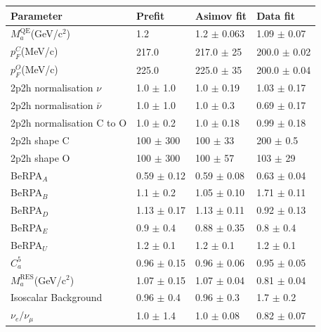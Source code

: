 \begin{table}[ht]
  \center
  \begin{tabular}{llll}
    \toprule
    Parameter & Prefit & \Gls{Asimov} fit & Data fit  \\
    \midrule
    $M_a^{\text{QE}}$(GeV/c$^2$)           & 1.2              & 1.2 $\pm$ 0.063 & 1.09 $\pm$ 0.07     \\ 
    $p_F^C$(MeV/c)                       & 217.0            & 217.0 $\pm$ 25  & 200.0 $\pm$ 0.02    \\ 
    $p_F^O$(MeV/c)                       & 225.0            & 225.0 $\pm$ 35  & 200.0 $\pm$ 0.04    \\ 
    \gls{2p2h} normalisation $\nu$       & 1.0 $\pm$ 1.0    & 1.0 $\pm$ 0.19  & 1.03 $\pm$ 0.17     \\ 
    \gls{2p2h} normalisation $\bar{\nu}$ & 1.0 $\pm$ 1.0    & 1.0 $\pm$ 0.3   & 0.69 $\pm$ 0.17     \\ 
    \gls{2p2h} normalisation C to O      & 1.0 $\pm$ 0.2    & 1.0 $\pm$ 0.18  & 0.99 $\pm$ 0.18     \\ 
    \gls{2p2h} shape C                   & 100 $\pm$ 300    & 100 $\pm$ 33  & 200 $\pm$ 0.5         \\ 
    \gls{2p2h} shape O                   & 100 $\pm$ 300    & 100 $\pm$ 57  & 103 $\pm$ 29          \\ 
    BeRPA$_A$                            & 0.59 $\pm$ 0.12  & 0.59 $\pm$ 0.08 & 0.63 $\pm$ 0.04     \\ 
    BeRPA$_B$                            & 1.1 $\pm$ 0.2    & 1.05 $\pm$ 0.10 & 1.71 $\pm$ 0.11     \\ 
    BeRPA$_D$                            & 1.13 $\pm$ 0.17  & 1.13 $\pm$ 0.11 & 0.92 $\pm$ 0.13     \\ 
    BeRPA$_E$                            & 0.9 $\pm$ 0.4    & 0.88 $\pm$ 0.35 & 0.8 $\pm$ 0.4       \\ 
    BeRPA$_U$                            & 1.2 $\pm$ 0.1    & 1.2 $\pm$ 0.1   & 1.2 $\pm$ 0.1       \\ 
    $C_a^5$                              & 0.96 $\pm$ 0.15  & 0.96 $\pm$ 0.06 & 0.95 $\pm$ 0.05     \\ 
    $M_a^{\text{RES}}$(GeV/c$^2$)          & 1.07 $\pm$ 0.15  & 1.07 $\pm$ 0.04 & 0.81 $\pm$ 0.04     \\ 
    Isoscalar Background                 & 0.96 $\pm$ 0.4   & 0.96 $\pm$ 0.3  & 1.7 $\pm$ 0.2       \\ 
    $\nu_e/\nu_\mu$                       & 1.0 $\pm$ 1.4  & 1.0 $\pm$ 0.08  & 0.82 $\pm$ 0.07       \\ 

\end{tabular}
\end{table}
